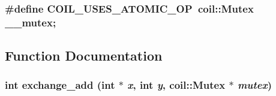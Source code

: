 \subsubsection[{COIL\_\-USES\_\-ATOMIC\_\-OP}]{\setlength{\rightskip}{0pt plus 5cm}\#define COIL\_\-USES\_\-ATOMIC\_\-OP~{\bf coil::Mutex} \_\-\_\-mutex;}\label{atomic_8h_aa3a3b38e82e6515e0b984532de4ca8b6}


\subsection{Function Documentation}
\subsubsection[{exchange\_\-add}]{\setlength{\rightskip}{0pt plus 5cm}int exchange\_\-add (int $\ast$ {\em x}, \/  int {\em y}, \/  {\bf coil::Mutex} $\ast$ {\em mutex})}\label{atomic_8h_a29a8d5c103d5dae310ea72b991f6afc0}

